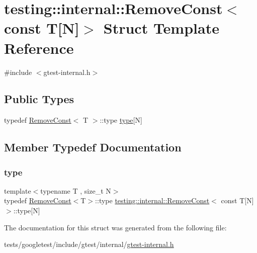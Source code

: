 \hypertarget{structtesting_1_1internal_1_1RemoveConst_3_01const_01T[N]_4}{}\section{testing\+:\+:internal\+:\+:Remove\+Const$<$ const T\mbox{[}N\mbox{]}$>$ Struct Template Reference}
\label{structtesting_1_1internal_1_1RemoveConst_3_01const_01T[N]_4}


{\ttfamily \#include $<$gtest-\/internal.\+h$>$}

\subsection*{Public Types}
\begin{DoxyCompactItemize}
\item 
typedef \hyperlink{structtesting_1_1internal_1_1RemoveConst}{Remove\+Const}$<$ T $>$\+::type \hyperlink{structtesting_1_1internal_1_1RemoveConst_3_01const_01T[N]_4_ac976b53cb5d031a120fafbe790650068}{type}\mbox{[}N\mbox{]}
\end{DoxyCompactItemize}


\subsection{Member Typedef Documentation}
\mbox{\label{structtesting_1_1internal_1_1RemoveConst_3_01const_01T[N]_4_ac976b53cb5d031a120fafbe790650068}} 
\subsubsection{\texorpdfstring{type}{type}}
{\footnotesize\ttfamily template$<$typename T , size\+\_\+t N$>$ \\
typedef \hyperlink{structtesting_1_1internal_1_1RemoveConst}{Remove\+Const}$<$T$>$\+::type \hyperlink{structtesting_1_1internal_1_1RemoveConst}{testing\+::internal\+::\+Remove\+Const}$<$ const T\mbox{[}N\mbox{]}$>$\+::type\mbox{[}N\mbox{]}}



The documentation for this struct was generated from the following file\+:\begin{DoxyCompactItemize}
\item 
tests/googletest/include/gtest/internal/\hyperlink{gtest-internal_8h}{gtest-\/internal.\+h}\end{DoxyCompactItemize}
